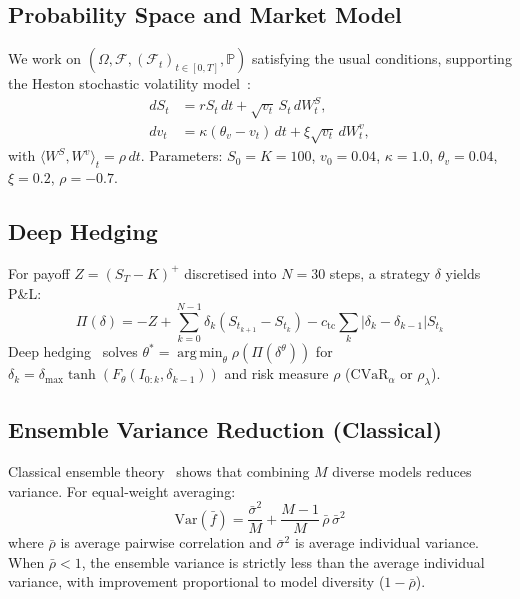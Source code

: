 \documentclass[11pt]{article}
\newcommand{\F}{\mathcal{F}}
\newcommand{\PP}{\mathbb{P}}
\newcommand{\cvar}{\mathrm{CVaR}}
\DeclareMathOperator*{\argmin}{arg\,min}
\begin{document}
\subsection{Probability Space and Market Model}

We work on $(\Omega, \F, (\F_t)_{t\in[0,T]}, \PP)$ satisfying the usual conditions, supporting the Heston stochastic volatility model~\citep{heston1993closed}:
\begin{align}
    dS_t &= rS_t\,dt + \sqrt{v_t}\,S_t\,dW^S_t, \label{eq:heston_s}\\
    dv_t &= \kappa(\theta_v - v_t)\,dt + \xi\sqrt{v_t}\,dW^v_t, \label{eq:heston_v}
\end{align}
with $\langle W^S,W^v\rangle_t = \rho\,dt$. Parameters: $S_0=K=100$, $v_0=0.04$, $\kappa=1.0$, $\theta_v=0.04$, $\xi=0.2$, $\rho=-0.7$.

\subsection{Deep Hedging}

For payoff $Z=(S_T-K)^+$ discretised into $N=30$ steps, a strategy $\delta$ yields P\&L:
\begin{equation}
    \Pi(\delta) = -Z + \sum_{k=0}^{N-1}\delta_k(S_{t_{k+1}}-S_{t_k}) - c_{\mathrm{tc}}\sum_k|\delta_k-\delta_{k-1}|S_{t_k}
\end{equation}
Deep hedging~\citep{buehler2019deep} solves $\theta^* = \argmin_\theta \rho(\Pi(\delta^\theta))$ for $\delta_k = \delta_{\max}\tanh(F_\theta(I_{0:k}, \delta_{k-1}))$ and risk measure $\rho$ ($\cvar_\alpha$ or $\rho_\lambda$).

\subsection{Ensemble Variance Reduction (Classical)}

Classical ensemble theory~\citep{dietterich2000ensemble} shows that combining $M$ diverse models reduces variance. For equal-weight averaging:
\begin{equation}
    \mathrm{Var}(\bar{f}) = \frac{\bar\sigma^2}{M} + \frac{M-1}{M}\,\bar\rho\,\bar\sigma^2
    \label{eq:ensemble_classical}
\end{equation}
where $\bar{\rho}$ is average pairwise correlation and $\bar\sigma^2$ is average individual variance. When $\bar\rho < 1$, the ensemble variance is strictly less than the average individual variance, with improvement proportional to model diversity ($1-\bar\rho$).
\end{document}
